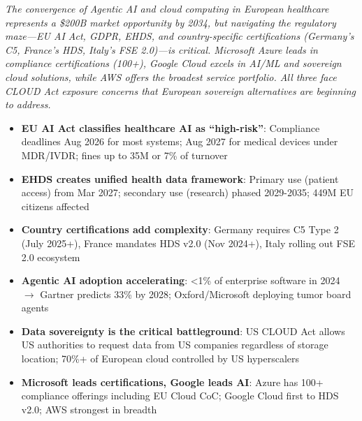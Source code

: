 \documentclass[11pt,a4paper]{article}
\begin{document}
\vspace{6pt}

\textit{The convergence of Agentic AI and cloud computing in European healthcare represents a \$200B market opportunity by 2034, but navigating the regulatory maze---EU AI Act, GDPR, EHDS, and country-specific certifications (Germany's C5, France's HDS, Italy's FSE 2.0)---is critical. Microsoft Azure leads in compliance certifications (100+), Google Cloud excels in AI/ML and sovereign cloud solutions, while AWS offers the broadest service portfolio. All three face CLOUD Act exposure concerns that European sovereign alternatives are beginning to address.}

\vspace{10pt}

\begin{tcolorbox}[colback=mslightgray, colframe=msblue, boxrule=1pt, arc=3pt, left=8pt, right=8pt, top=6pt, bottom=6pt, title={\textbf{Key Takeaways}}]
\begin{itemize}
    \item \textbf{EU AI Act classifies healthcare AI as ``high-risk''}: Compliance deadlines Aug 2026 for most systems; Aug 2027 for medical devices under MDR/IVDR; fines up to \texteuro35M or 7\% of turnover
    \item \textbf{EHDS creates unified health data framework}: Primary use (patient access) from Mar 2027; secondary use (research) phased 2029-2035; 449M EU citizens affected
    \item \textbf{Country certifications add complexity}: Germany requires C5 Type 2 (July 2025+), France mandates HDS v2.0 (Nov 2024+), Italy rolling out FSE 2.0 ecosystem
    \item \textbf{Agentic AI adoption accelerating}: <1\% of enterprise software in 2024 $\rightarrow$ Gartner predicts 33\% by 2028; Oxford/Microsoft deploying tumor board agents
    \item \textbf{Data sovereignty is the critical battleground}: US CLOUD Act allows US authorities to request data from US companies regardless of storage location; 70\%+ of European cloud controlled by US hyperscalers
    \item \textbf{Microsoft leads certifications, Google leads AI}: Azure has 100+ compliance offerings including EU Cloud CoC; Google Cloud first to HDS v2.0; AWS strongest in breadth
\end{itemize}
\end{tcolorbox}
\end{document}
